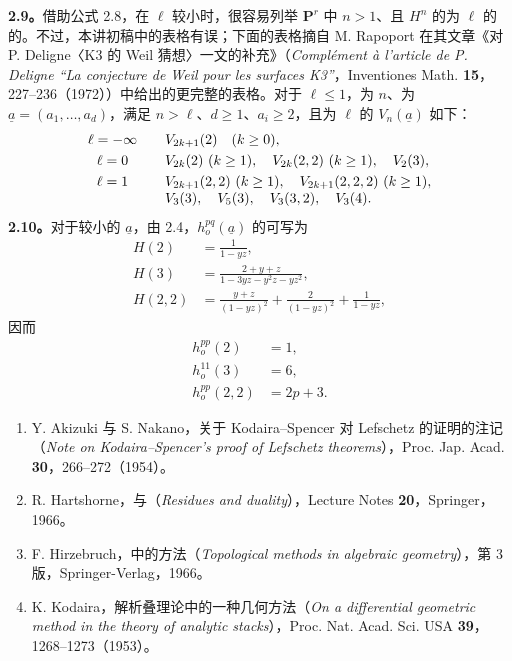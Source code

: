 \textbf{2.9。}借助公式 2.8，在 $\ell$ 较小时，很容易列举 $\mathbf P^r$ 中 $n>1$、且 $H^n$ 的为 $\ell$ 的的。不过，本讲初稿中的表格有误；下面的表格摘自 M. Rapoport 在其文章《对 P. Deligne〈K3 的 Weil 猜想〉一文的补充》（\textit{Complément à l'article de P. Deligne ``La conjecture de Weil pour les surfaces K3''}，Inventiones Math. \textbf{15}，227--236（1972））中给出的更完整的表格。对于 $\ell\leq1$，为 $n$、为 $\underline a=(a_1,\ldots,a_d)$，满足 $n>\ell$、$d\geq1$、$a_i\geq2$，且为 $\ell$ 的 $V_n(\underline a)$ 如下：
\[
\begin{array}{c@{\qquad}l}
\ell=-\infty&V_{2k+1}(2)\quad(k\geq0),\\[3pt]
\ell=0&V_{2k}(2)\ (k\geq1),\quad V_{2k}(2,2)\ (k\geq1),\quad V_2(3),\\[3pt]
\ell=1&V_{2k+1}(2,2)\ (k\geq1),\quad V_{2k+1}(2,2,2)\ (k\geq1),\\
&V_3(3),\quad V_5(3),\quad V_3(3,2),\quad V_3(4).
\end{array}
\]
\textbf{2.10。}对于较小的 $\underline a$，由 2.4，$h_o^{pq}(\underline a)$ 的可写为
\[
\begin{aligned}
 H(2)&=\frac1{1-yz},\\
 H(3)&=\frac{2+y+z}{1-3yz-y^2z-yz^2},\\
 H(2,2)&=\frac{y+z}{(1-yz)^2}+\frac2{(1-yz)^2}+\frac1{1-yz},
\end{aligned}
\]
因而
\[
\begin{aligned}
 h_o^{pp}(2)&=1,\\
 h_o^{11}(3)&=6,\\
 h_o^{pp}(2,2)&=2p+3.
\end{aligned}
\]

\begin{enumerate}
\item[{[1]}] Y. Akizuki 与 S. Nakano，关于 Kodaira--Spencer 对 Lefschetz 的证明的注记（\textit{Note on Kodaira--Spencer's proof of Lefschetz theorems}），Proc. Jap. Acad. \textbf{30}，266--272（1954）。
\item[{[2]}] R. Hartshorne，与（\textit{Residues and duality}），Lecture Notes \textbf{20}，Springer，1966。
\item[{[3]}] F. Hirzebruch，中的方法（\textit{Topological methods in algebraic geometry}），第 3 版，Springer-Verlag，1966。
\item[{[4]}] K. Kodaira，解析叠理论中的一种几何方法（\textit{On a differential geometric method in the theory of analytic stacks}），Proc. Nat. Acad. Sci. USA \textbf{39}，1268--1273（1953）。
\end{enumerate}
